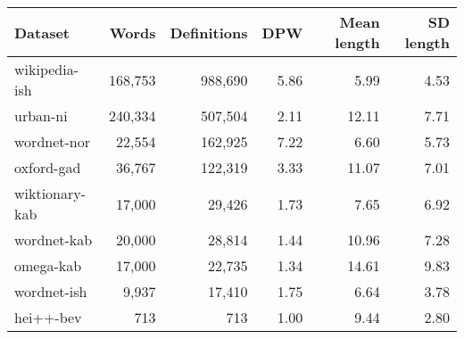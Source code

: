 \begin{tabular}{|l|rr|rrr|}
    \hline
    Dataset        & Words   & Definitions & DPW  & Mean length & SD length \\
    \hline
    wikipedia-ish  & 168,753 & 988,690     & 5.86 & 5.99        & 4.53      \\
    urban-ni       & 240,334 & 507,504     & 2.11 & 12.11       & 7.71      \\
    wordnet-nor    & 22,554  & 162,925     & 7.22 & 6.60        & 5.73      \\
    oxford-gad     & 36,767  & 122,319     & 3.33 & 11.07       & 7.01      \\
    wiktionary-kab & 17,000  & 29,426      & 1.73 & 7.65        & 6.92      \\
    wordnet-kab    & 20,000  & 28,814      & 1.44 & 10.96       & 7.28      \\
    omega-kab      & 17,000  & 22,735      & 1.34 & 14.61       & 9.83      \\
    wordnet-ish    & 9,937   & 17,410      & 1.75 & 6.64        & 3.78      \\
    hei++-bev      & 713     & 713         & 1.00 & 9.44        & 2.80      \\
    \hline
\end{tabular}
